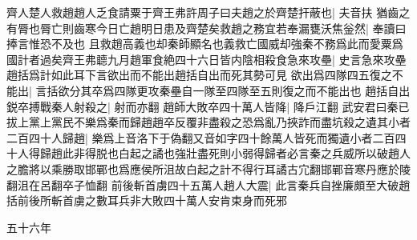 齊人楚人救趙趙人乏食請粟于齊王弗許周子曰夫趙之於齊楚扞蔽也|{
	夫音扶}
猶齒之有脣也脣亡則齒寒今日亡趙明日患及齊楚矣救趙之務宜若奉漏甕沃焦釡然|{
	奉讀曰捧言惟恐不及也}
且救趙高義也却秦師顯名也義救亡國威却強秦不務爲此而愛粟爲國計者過矣齊王弗聼九月趙軍食絶四十六日皆内陰相殺食急來攻壘|{
	史言急來攻壘趙括爲計如此耳下言欲出而不能出趙括自出而死其勢可見}
欲出爲四隊四五復之不能出|{
	言括欲分其卒爲四隊更攻秦壘自一隊至四隊至五則復之而不能出也}
趙括自出鋭卒搏戰秦人射殺之|{
	射而亦翻}
趙師大敗卒四十萬人皆降|{
	降戶江翻}
武安君曰秦已拔上黨上黨民不樂爲秦而歸趙趙卒反覆非盡殺之恐爲亂乃挾詐而盡坑殺之遺其小者二百四十人歸趙|{
	樂爲上音洛下于偽翻又音如字四十餘萬人皆死而獨遺小者二百四十人得歸趙此非得脱也白起之譎也強壯盡死則小弱得歸者必言秦之兵威所以破趙人之膽將以乘勝取邯鄲也爲應侯所沮故白起之計不得行耳譎古宂翻邯鄲音寒丹應於陵翻沮在呂翻卒子恤翻}
前後斬首虜四十五萬人趙人大震|{
	此言秦兵自挫廉頗至大破趙括前後所斬首虜之數耳兵非大敗四十萬人安肯束身而死邪}


五十六年


